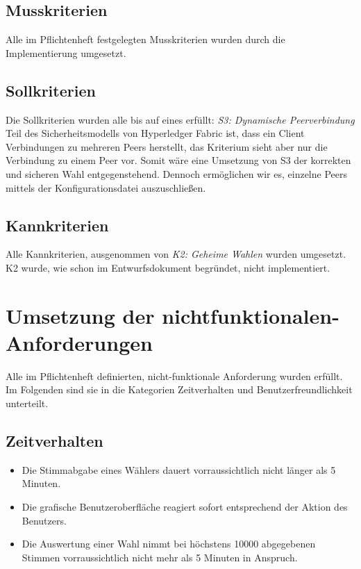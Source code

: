 \documentclass[parskip=full]{scrartcl}
\begin{document}
\subsection{Musskriterien}
Alle im Pflichtenheft festgelegten Musskriterien wurden durch die Implementierung umgesetzt.

\subsection{Sollkriterien}
Die Sollkriterien wurden alle bis auf eines erfüllt:
\textit{S3: Dynamische Peerverbindung}\\
Teil des Sicherheitsmodells von Hyperledger Fabric ist, dass ein Client Verbindungen zu mehreren Peers herstellt, das Kriterium sieht aber nur die Verbindung zu einem Peer vor.
Somit wäre eine Umsetzung von S3 der korrekten und sicheren Wahl entgegenstehend. Dennoch ermöglichen wir es, einzelne Peers mittels der Konfigurationsdatei auszuschließen.  

\subsection{Kannkriterien}
Alle Kannkriterien, ausgenommen von \textit{K2: Geheime Wahlen} wurden umgesetzt. K2 wurde, wie schon im Entwurfsdokument begründet, nicht implementiert.

\section{Umsetzung der nichtfunktionalen-Anforderungen}

Alle im Pflichtenheft definierten, nicht-funktionale Anforderung wurden erfüllt. Im Folgenden sind sie in die Kategorien Zeitverhalten und Benutzerfreundlichkeit unterteilt.

\subsection{Zeitverhalten}

\begin{itemize}
	\item Die Stimmabgabe eines Wählers dauert vorraussichtlich nicht länger als 5 Minuten.
	\item Die grafische Benutzeroberfläche reagiert sofort entsprechend der Aktion des Benutzers.
	\item Die Auswertung einer Wahl nimmt bei höchstens 10000 abgegebenen Stimmen vorraussichtlich nicht mehr als 5 Minuten in Anspruch.
\end{itemize}
\end{document}
